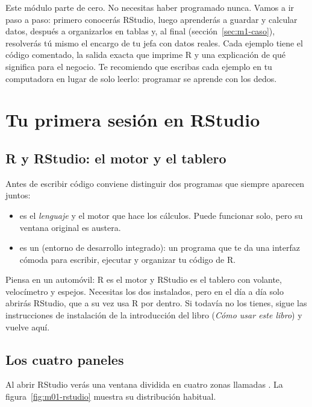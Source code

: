 Este módulo parte de cero. No necesitas haber programado nunca. Vamos a ir
paso a paso: primero conocerás RStudio, luego aprenderás a guardar y
calcular datos, después a organizarlos en tablas y, al final
(sección~\ref{sec:m1-caso}), resolverás tú mismo el encargo de tu jefa con
datos reales. Cada ejemplo tiene el código comentado, la salida exacta que
imprime R y una explicación de qué significa para el negocio. Te recomiendo
que escribas cada ejemplo en tu computadora en lugar de solo leerlo: programar
se aprende con los dedos.

\section{Tu primera sesión en RStudio}
\label{sec:m1-rstudio}

\subsection{R y RStudio: el motor y el tablero}

Antes de escribir código conviene distinguir dos programas que siempre
aparecen juntos:

\begin{itemize}
  \item {} es el \emph{lenguaje} y el motor que hace los cálculos.
        Puede funcionar solo, pero su ventana original es austera.
  \item {} es un  (entorno de desarrollo
        integrado): un programa que te da una interfaz cómoda para escribir,
        ejecutar y organizar tu código de R.
\end{itemize}

Piensa en un automóvil: R es el motor y RStudio es el tablero con volante,
velocímetro y espejos. Necesitas los dos instalados, pero en el día a día solo
abrirás RStudio, que a su vez usa R por dentro. Si todavía no los tienes,
sigue las instrucciones de instalación de la introducción del libro
(\emph{Cómo usar este libro}) y vuelve aquí.

\subsection{Los cuatro paneles}

Al abrir RStudio verás una ventana dividida en cuatro zonas llamadas
. La figura~\ref{fig:m01-rstudio} muestra su distribución
habitual.

